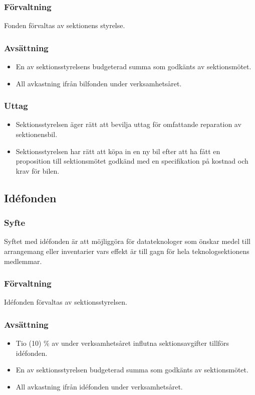 \documentclass[a4paper]{dtek}
\begin{document}
\subsubsection{Förvaltning}
Fonden förvaltas av sektionens styrelse.
\subsubsection{Avsättning}
\begin{itemize}
\item En av sektionsstyrelsens budgeterad summa som godkänts av sektionsmötet.
\item All avkastning ifrån bilfonden under verksamhetsåret.
\end{itemize}
\subsubsection{Uttag}
\begin{itemize}
    \item Sektionsstyrelsen äger rätt att bevilja uttag för omfattande reparation av sektionensbil.
    \item Sektionsstyrelsen har rätt att köpa in en ny bil efter att ha fått en proposition till sektionsmötet godkänd med en specifikation på kostnad och krav för bilen.
\end{itemize}

\subsection{Idéfonden}
\subsubsection{Syfte}
\label{sec:idefond_syfte}
Syftet med idéfonden är att möjliggöra för datateknologer som önskar medel till arrangemang eller inventarier vars effekt är till gagn för hela teknologsektionens medlemmar.
\subsubsection{Förvaltning}
Idéfonden förvaltas av sektionsstyrelsen.
\subsubsection{Avsättning}
\begin{itemize}
\item Tio (10) \% av under verksamhetsåret influtna sektionsavgifter tillförs idéfonden.
\item En av sektionsstyrelsen budgeterad summa som godkänts av sektionsmötet.
\item All avkastning ifrån idéfonden under verksamhetsåret.
\end{itemize}
\end{document}
